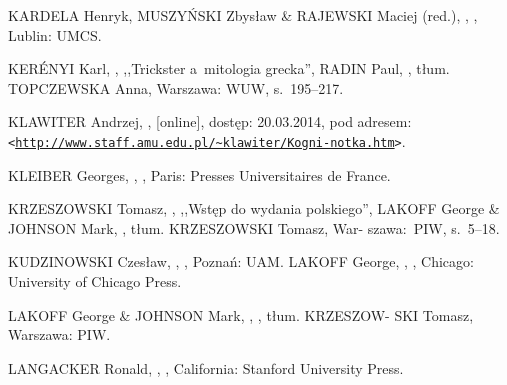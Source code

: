 \documentclass[11pt,a4paper,twoside]{report}
\begin{document}
\begin{thebibliography}{}
{KARDELA Henryk, MUSZYŃSKI Zbysław \& RAJEWSKI Maciej (red.)},
,
,
\newblock Lublin: UMCS.

{KERÉNYI Karl},
,
\newblock ,,Trickster a~mitologia grecka'',
\newblock {[w:]} {RADIN Paul},
,
\newblock tłum. {TOPCZEWSKA Anna},
\newblock Warszawa: WUW,
\newblock s.~195--217.

{KLAWITER Andrzej},
,
 [online], dostęp: 20.03.2014, pod adresem: {\small \texttt{<\url{http://www.staff.amu.edu.pl/~klawiter/Kogni-notka.htm}>}}.

{KLEIBER Georges},
,
,
\newblock Paris: Presses Universitaires de France.

{KRZESZOWSKI Tomasz},
,
\newblock ,,Wstęp do wydania polskiego'',
\newblock {[do:]} {LAKOFF George \linebreak \& JOHNSON Mark},
,
\newblock tłum. {KRZESZOWSKI Tomasz},
\newblock War- \linebreak szawa:~PIW,
\newblock s.~5--18.

{KUDZINOWSKI Czesław},
,
,
\newblock Poznań: UAM.
\newpage
{}
{LAKOFF George},
,
,
\newblock Chicago: University of Chicago Press.

{LAKOFF George \& JOHNSON Mark},
,
,
\newblock tłum. {KRZESZOW- \linebreak SKI Tomasz},
\newblock Warszawa: PIW.

{LANGACKER Ronald},
,
,
\newblock California: Stanford University Press.


\end{thebibliography}
\end{document}
